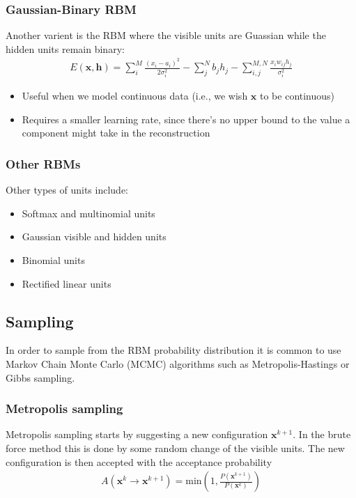 \documentclass[norsk,a4paper,11pt]{article}
\newcommand{\Vx}{\mathbf{x}}
\begin{document}
\subsubsection{Gaussian-Binary RBM}
Another varient is the RBM where the visible units are Guassian while the hidden units remain binary:
\begin{align}
	E(\Vx, \mathbf{h}) = \sum_i^M \frac{(x_i - a_i)^2}{2\sigma_i^2} - \sum_j^N b_j h_j - \sum_{i,j}^{M,N} \frac{x_i w_{ij} h_j}{\sigma_i^2} 
\end{align}
\begin{itemize}
	\item Useful when we model continuous data (i.e., we wish $\Vx$ to be continuous)
	\item Requires a smaller learning rate, since there's no upper bound to the value a component might take in the reconstruction
\end{itemize}

\subsubsection{Other RBMs}
Other types of units include:
\begin{itemize}
	\item Softmax and multinomial units
	\item Gaussian visible and hidden units
	\item Binomial units
	\item Rectified linear units
\end{itemize}

\subsection{Sampling}
In order to sample from the RBM probability distribution it is common to use Markov Chain Monte Carlo (MCMC) algorithms such as Metropolis-Hastings or Gibbs sampling.

\subsubsection{Metropolis sampling}
Metropolis sampling starts by suggesting a new configuration $\bm{x}^{k+1}$. In the brute force method this is done by some random change of the visible units. The new configuration is then accepted with the acceptance probability
\begin{align}
	A(\bm{x}^k \rightarrow \bm{x}^{k+1}) = \text{min} (1, \frac{P(\bm{x}^{k+1})}{P(\bm{x}^k)})
\end{align} 
\end{document}
